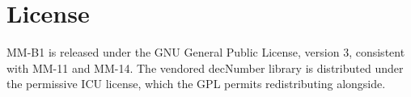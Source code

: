 \documentclass[11pt]{article}
\begin{document}
\section{License}

MM-B1 is released under the GNU General Public License, version 3, consistent
with MM-11 and MM-14. The vendored decNumber library is distributed under the
permissive ICU license, which the GPL permits redistributing alongside.
\end{document}
